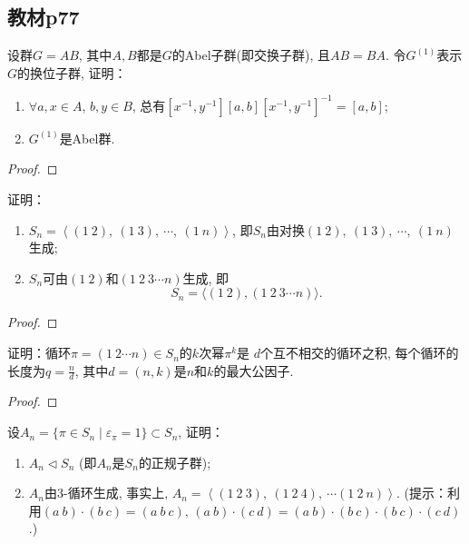 \subsection{教材p77}

\begin{problem}
    设群$G = AB$, 其中$A, B$都是$G$的Abel子群(即交换子群),
且$AB = BA$. 令$G^{(1)}$表示$G$的换位子群, 证明：
\begin{enumerate}[(1)]
    \item $\forall a, x \in A$, $b, y \in B$,
总有$[x^{-1}, y^{-1}][a, b][x^{-1}, y^{-1}]^{-1} = [a, b]$;
    \item $G^{(1)}$是Abel群.
\end{enumerate}
\end{problem}

\begin{proof}
    
\end{proof}

\begin{problem}
    证明：
\begin{enumerate}[(1)]
    \item $S_{n} = \left\langle (1\:2),\: (1\:3),\: \cdots,\: (1\:n) \right\rangle$,
即$S_n$由对换$(1\:2),\: (1\:3),\: \cdots,\: (1\:n)$生成;
    \item $S_{n}$可由$(1\:2)$和$(1\:2\:3 \cdots n)$生成, 即
\[
    S_n = \big\langle (1\:2),(1\:2\:3 \cdots n) \big\rangle.
\]
\end{enumerate}
\end{problem}

\begin{proof}
    
\end{proof}

\begin{problem}
    证明：循环$\pi = (1\:2 \cdots n) \in S_n$的$k$次幂$\pi^k$是
$d$个互不相交的循环之积, 每个循环的长度为$q = \frac nd$,
其中$d = (n, k)$是$n$和$k$的最大公因子.
\end{problem}

\begin{proof}
    
\end{proof}

\begin{problem}
    设$A_n= \{\pi \in S_n \mid \varepsilon_\pi = 1\} \subset S_n$,
证明：
\begin{enumerate}[(1)]
    \item $A_n \lhd S_n$ (即$A_n$是$S_n$的正规子群);
    \item $A_n$由$3$-循环生成, 事实上, $A_n = \left\langle (1\:2\:3),\: (1\:2\:4),\: \cdots (1\:2\:n) \right\rangle$.
(提示：利用$(a\:b) \cdot (b\:c) = (a\:b\:c),\, (a\:b) \cdot (c\:d) = (a\:b) \cdot (b\:c) \cdot (b\:c) \cdot (c\:d)$.)
\end{enumerate}
\end{problem}

